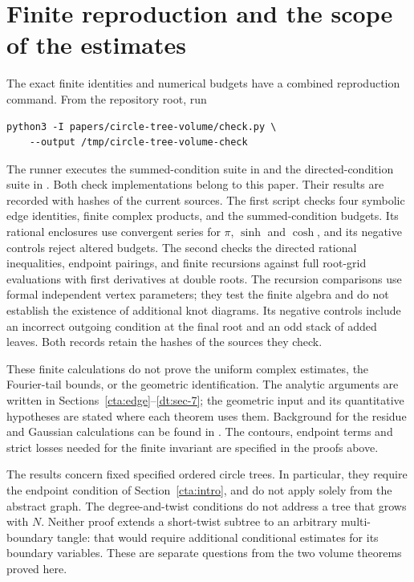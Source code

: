 \section{Finite reproduction and the scope of the estimates}\label{dt:reproduction}

The exact finite identities and numerical budgets have a combined
reproduction command. From the repository root, run
\begin{verbatim}
python3 -I papers/circle-tree-volume/check.py \
    --output /tmp/circle-tree-volume-check
\end{verbatim}
The runner executes the summed-condition suite in
 and the
directed-condition suite in
. Both check
implementations belong to this paper. Their results are recorded
with hashes of the current sources.
The first script checks four symbolic edge identities, finite complex
products, and the summed-condition budgets. Its rational enclosures
use convergent series for \(\pi\), \(\sinh\) and \(\cosh\), and its
negative controls reject altered budgets. The second checks the
directed rational inequalities, endpoint pairings, and finite
recursions against full root-grid evaluations with first derivatives at double roots.
The recursion comparisons use formal independent vertex parameters;
they test the finite algebra and do not establish the existence of
additional knot diagrams. Its negative controls include an incorrect
outgoing condition at the final root and an odd stack of added leaves.
Both records retain the hashes of the sources they check.

These finite calculations do not prove the uniform complex estimates,
the Fourier-tail bounds, or the geometric identification. The analytic
arguments are written in Sections~\ref{cta:edge}--\ref{dt:sec-7};
the geometric input and its quantitative hypotheses are stated where
each theorem uses them. Background for the residue and Gaussian
calculations can be found in \cite[Sections~2.4(iii)--(iv)]{DLMF}.
The contours, endpoint terms and strict losses needed for the finite
invariant are specified in the proofs above.

The results concern fixed specified ordered circle trees. In particular,
they require the endpoint condition of Section~\ref{cta:intro}, and do
not apply solely from the abstract graph. The degree-and-twist
conditions do not address a tree that grows with \(N\). Neither proof
extends a short-twist subtree to an arbitrary multi-boundary tangle:
that would require additional conditional estimates for its boundary
variables. These are separate questions from the two volume theorems
proved here.
